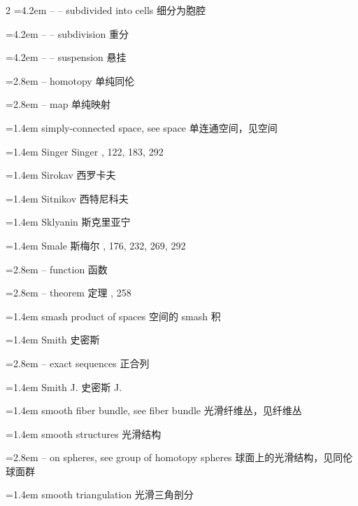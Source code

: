 \begin{multicols}{2}
\noindent\hangindent=4.2em -- -- subdivided into cells \quad 细分为胞腔 \par
\noindent\hangindent=4.2em -- -- subdivision \quad 重分 \par
\noindent\hangindent=4.2em -- -- suspension \quad 悬挂 \par
\noindent\hangindent=2.8em -- homotopy \quad 单纯同伦 \par
\noindent\hangindent=2.8em -- map \quad 单纯映射 \par
\noindent\hangindent=1.4em simply-connected space, see space \quad 单连通空间，见空间 \quad\par
\noindent\hangindent=1.4em Singer \quad Singer , 122, 183, 292\par
\noindent\hangindent=1.4em Sirokav \quad 西罗卡夫 \par
\noindent\hangindent=1.4em Sitnikov \quad 西特尼科夫 \par
\noindent\hangindent=1.4em Sklyanin \quad 斯克里亚宁 \par
\noindent\hangindent=1.4em Smale \quad 斯梅尔 , 176, 232, 269, 292\par
\noindent\hangindent=2.8em -- function \quad 函数 \par
\noindent\hangindent=2.8em -- theorem \quad 定理 , 258\par
\noindent\hangindent=1.4em smash product of spaces \quad 空间的 smash 积 \par
\noindent\hangindent=1.4em Smith \quad 史密斯 \par
\noindent\hangindent=2.8em -- exact sequences \quad 正合列 \par
\noindent\hangindent=1.4em Smith J. \quad 史密斯 J. \par
\noindent\hangindent=1.4em smooth fiber bundle, see fiber bundle \quad 光滑纤维丛，见纤维丛 \quad\par
\noindent\hangindent=1.4em smooth structures \quad 光滑结构 \quad\par
\noindent\hangindent=2.8em -- on spheres, see group of homotopy spheres \quad 球面上的光滑结构，见同伦球面群 \quad\par
\noindent\hangindent=1.4em smooth triangulation \quad 光滑三角剖分 \par

\end{multicols}
